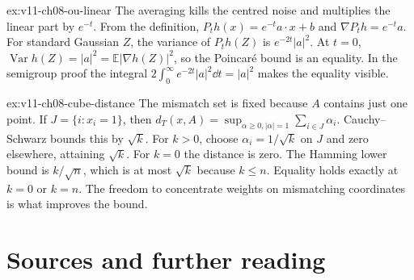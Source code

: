 \begin{solution}{ex:v11-ch08-ou-linear}
\idea The averaging kills the centred noise and multiplies the linear part by $e^{-t}$.
\writeup From the definition, $P_th(x)=e^{-t}a\cdot x+b$ and $\nabla P_th=e^{-t}a$. For standard Gaussian $Z$, the variance of $P_th(Z)$ is $e^{-2t}|a|^2$. At $t=0$, $\operatorname{Var}h(Z)=|a|^2=\mathbb E|\nabla h(Z)|^2$, so the Poincar\'e bound is an equality. In the semigroup proof the integral $2\int_0^\infty e^{-2t}|a|^2\dd t=|a|^2$ makes the equality visible.
\end{solution}

\begin{solution}{ex:v11-ch08-cube-distance}
\idea The mismatch set is fixed because $A$ contains just one point.
\writeup If $J=\{i:x_i=1\}$, then $d_T(x,A)=\sup_{\alpha\ge0,|\alpha|=1}\sum_{i\in J}\alpha_i$. Cauchy--Schwarz bounds this by $\sqrt k$. For $k>0$, choose $\alpha_i=1/\sqrt k$ on $J$ and zero elsewhere, attaining $\sqrt k$. For $k=0$ the distance is zero. The Hamming lower bound is $k/\sqrt n$, which is at most $\sqrt k$ because $k\le n$. Equality holds exactly at $k=0$ or $k=n$. The freedom to concentrate weights on mismatching coordinates is what improves the bound.
\end{solution}

\section*{Sources and further reading}

